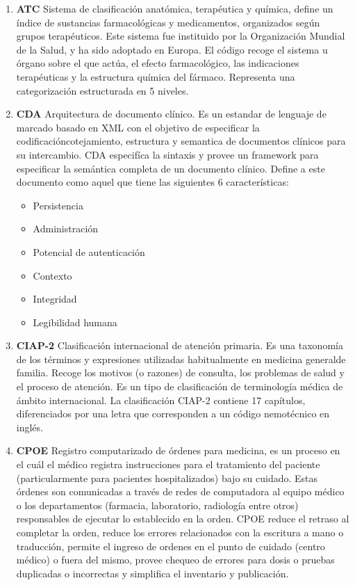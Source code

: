 \begin{enumerate}
    \item\textbf{ATC} Sistema de clasificación anatómica, terapéutica y química, define un índice de sustancias farmacológicas y medicamentos, organizados según grupos terapéuticos. Este sistema fue instituido por la Organización Mundial de la Salud, y ha sido adoptado en Europa. El código recoge el sistema u órgano sobre el que actúa, el efecto farmacológico, las indicaciones terapéuticas y la estructura química del fármaco. Representa una categorización estructurada en 5 niveles.
    
    \item\textbf{CDA} Arquitectura de documento clínico. Es un estandar de lenguaje de marcado basado en XML con el objetivo de especificar la codificación\/cotejamiento, estructura y semantica de documentos clínicos para su intercambio. CDA especifíca la sintaxis y provee un framework para especificar la semántica completa de un documento clínico. Define a este documento como aquel que tiene las siguientes 6 características:
      \begin{itemize}
          \item Persistencia
          \item Administración
          \item Potencial de autenticación
          \item Contexto
    	  \item Integridad
   		  \item Legibilidad humana
      \end{itemize}
      
    \item\textbf{CIAP-2} Clasificación internacional de atención primaria. Es una taxonomía de los términos y expresiones utilizadas habitualmente en medicina general\/de familia. Recoge los motivos (o razones) de consulta, los problemas de salud y el proceso de atención. Es un tipo de clasificación de terminología médica de ámbito internacional. La clasificación CIAP-2 contiene 17 capítulos, diferenciados por una letra que corresponden a un código nemotécnico en inglés.
    
    \item\textbf{CPOE} Registro computarizado de órdenes para medicina, es un proceso en el cuál el médico registra instrucciones para el tratamiento del paciente (particularmente para pacientes hospitalizados) bajo su cuidado. Estas órdenes son comunicadas a través de redes de computadora al equipo médico o los departamentos (farmacia, laboratorio, radiología entre otros) responsables de ejecutar lo establecido en la orden. CPOE reduce el retraso al completar la orden, reduce los errores relacionados con la escritura a mano o traducción, permite el ingreso de ordenes en el punto de cuidado (centro médico) o fuera del mismo, provee chequeo de errores para dosis o pruebas duplicadas o incorrectas y simplifica el inventario y publicación.
    

\end{enumerate}
